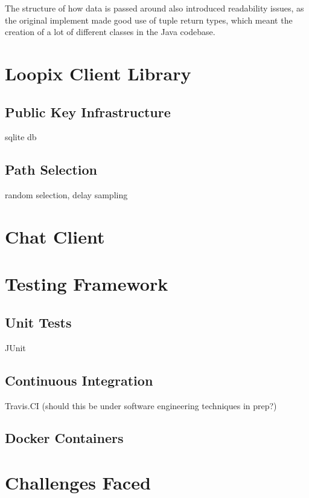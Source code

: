 \documentclass[12pt,a4paper,twoside,openright]{report}
\begin{document}
The structure of how data is passed around also introduced readability issues, as the original implement made good use of tuple return types, which meant the creation of a lot of different classes in the Java codebase.

\section{Loopix Client Library}

\subsection{Public Key Infrastructure}

sqlite db

\subsection{Path Selection}

random selection, delay sampling

\section{Chat Client}

\section{Testing Framework}

\subsection{Unit Tests}

JUnit

\subsection{Continuous Integration}

Travis.CI (should this be under software engineering techniques in prep?)

\subsection{Docker Containers}

\section{Challenges Faced}
\end{document}
